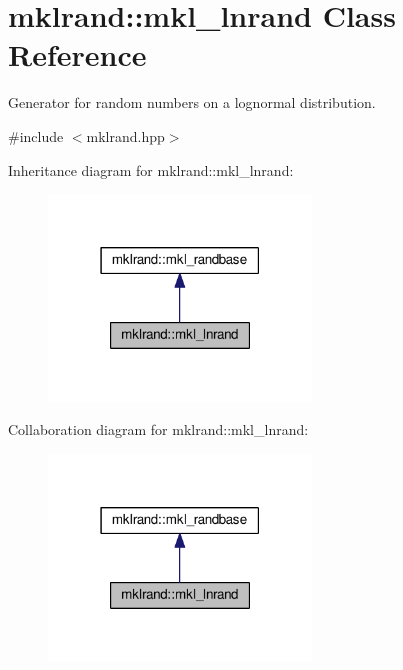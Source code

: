 \hypertarget{classmklrand_1_1mkl__lnrand}{}\section{mklrand\+:\+:mkl\+\_\+lnrand Class Reference}
\label{classmklrand_1_1mkl__lnrand}


Generator for random numbers on a lognormal distribution.  




{\ttfamily \#include $<$mklrand.\+hpp$>$}



Inheritance diagram for mklrand\+:\+:mkl\+\_\+lnrand\+:\nopagebreak
\begin{figure}[H]
\begin{center}
\leavevmode
\includegraphics[width=198pt]{d0/d84/classmklrand_1_1mkl__lnrand__inherit__graph}
\end{center}
\end{figure}


Collaboration diagram for mklrand\+:\+:mkl\+\_\+lnrand\+:\nopagebreak
\begin{figure}[H]
\begin{center}
\leavevmode
\includegraphics[width=198pt]{da/dc6/classmklrand_1_1mkl__lnrand__coll__graph}
\end{center}
\end{figure}
